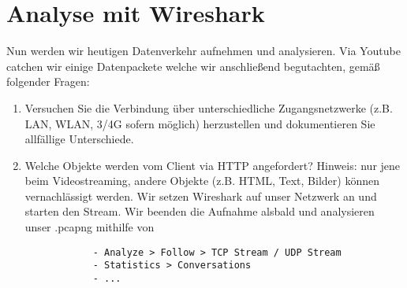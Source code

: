 \documentclass[11pt]{article}
\begin{document}
    \section{Analyse mit Wireshark}
    Nun werden wir heutigen Datenverkehr aufnehmen und analysieren. Via Youtube catchen wir
    einige Datenpackete welche wir anschließend begutachten, gemäß folgender Fragen:

    \begin{enumerate}
        \item Versuchen Sie die Verbindung über unterschiedliche Zugangsnetzwerke (z.B. LAN, WLAN, 3/4G sofern möglich) herzustellen und dokumentieren Sie allfällige Unterschiede.

        \item Welche Objekte werden vom Client via HTTP angefordert? Hinweis: nur jene beim Videostreaming, andere Objekte (z.B. HTML, Text, Bilder) können vernachlässigt werden.
            Wir setzen Wireshark auf unser Netzwerk an und starten  den Stream.
            Wir beenden die Aufnahme alsbald und analysieren unser .pcapng mithilfe von
        \begin{verbatim}
            - Analyze > Follow > TCP Stream / UDP Stream
            - Statistics > Conversations
            - ...
        \end{verbatim}

    \end{enumerate}
\end{document}
